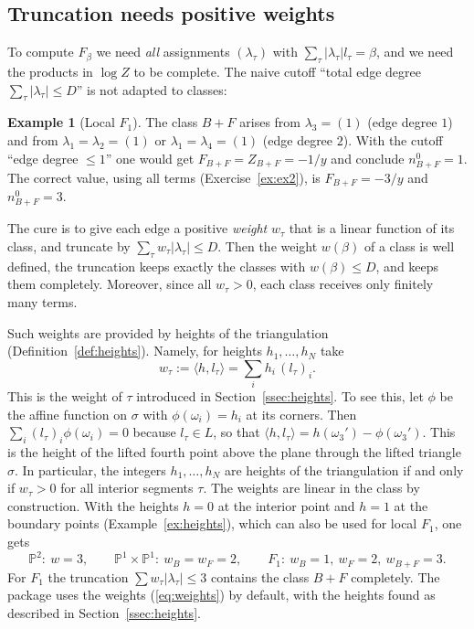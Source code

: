 \documentclass[11pt]{article}
\theoremstyle{plain}
\theoremstyle{definition}
\newtheorem{example}[theorem]{Example}
\theoremstyle{remark}
\newcommand{\PP}{\mathbb{P}}
\begin{document}
\subsection{Truncation needs positive weights}

To compute $F_\beta$ we need \textit{all} assignments $(\lambda_\tau)$ with
$\sum_\tau|\lambda_\tau|l_\tau=\beta$, and we need the products in $\log Z$ to be complete. The
naive cutoff ``total edge degree $\sum_\tau|\lambda_\tau|\le D$'' is not adapted to classes:

\begin{example}[Local $F_1$]\label{ex:F1trunc}
The class $B+F$ arises from $\lambda_3=(1)$ (edge degree $1$) and from
$\lambda_1=\lambda_2=(1)$ or $\lambda_1=\lambda_4=(1)$ (edge degree $2$). With the cutoff
``edge degree $\le1$'' one would get $F_{B+F}=Z_{B+F}=-1/y$ and conclude $n^0_{B+F}=1$. The
correct value, using all terms (Exercise~\ref{ex:ex2}), is $F_{B+F}=-3/y$ and $n^0_{B+F}=3$.
\end{example}

The cure is to give each edge a positive \textit{weight} $w_\tau$ that is a linear function of its
class, and truncate by $\sum_\tau w_\tau|\lambda_\tau|\le D$. Then the weight
$w(\beta)$ of a class is well defined, the truncation keeps exactly the classes with
$w(\beta)\le D$, and keeps them completely. Moreover, since all $w_\tau>0$, each class receives
only finitely many terms.

Such weights are provided by heights of the triangulation (Definition~\ref{def:heights}).
Namely, for heights $h_1,\ldots,h_N$ take
\begin{equation}\label{eq:weights}
w_\tau:=\langle h,l_\tau\rangle=\sum_ih_i\,(l_\tau)_i .
\end{equation}
This is the weight of $\tau$ introduced in Section~\ref{ssec:heights}. To see this, let $\phi$
be the affine function on $\sigma$ with $\phi(\omega_i)=h_i$ at its corners. Then
$\sum_i(l_\tau)_i\phi(\omega_i)=0$ because $l_\tau\in L$, so that
$\langle h,l_\tau\rangle=h(\omega_3')-\phi(\omega_3')$. This is the height of the lifted fourth
point above the plane through the lifted triangle $\sigma$. In particular, the integers
$h_1,\ldots,h_N$ are heights of the triangulation if and only if $w_\tau>0$ for all interior
segments $\tau$. The weights are linear in the class by construction. With the heights $h=0$ at
the interior point and $h=1$ at the boundary points (Example~\ref{ex:heights}), which can also
be used for local $F_1$, one gets
\begin{equation}
\PP^2:\ w=3,\qquad \PP^1\times\PP^1:\ w_B=w_F=2,\qquad F_1:\ w_B=1,\ w_F=2,\ w_{B+F}=3 .
\end{equation}
For $F_1$ the truncation $\sum w_\tau|\lambda_\tau|\le3$ contains the class $B+F$ completely.
The package uses the weights (\ref{eq:weights}) by default, with the heights found as described
in Section~\ref{ssec:heights}.
\end{document}
